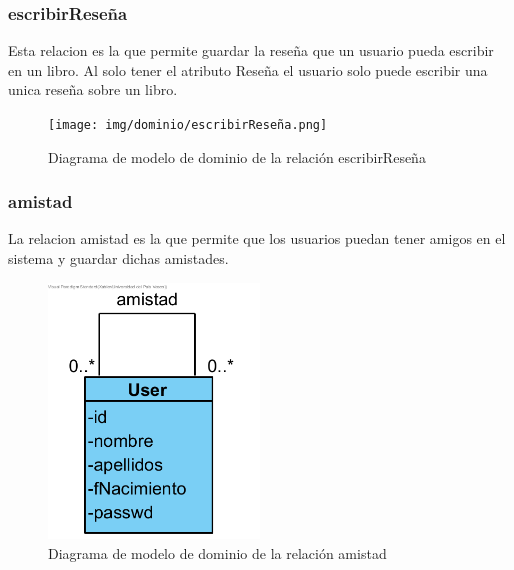 ﻿\documentclass{report}
\begin{document}
                \subsubsection{escribirReseña}
                    Esta relacion es la que permite guardar la reseña que un usuario pueda escribir en un libro. Al solo tener el atributo Reseña el usuario solo puede escribir una unica reseña sobre un libro.
                    \begin{figure}[H]
                        \centering
                        \texttt{[image: img/dominio/escribirReseña.png]}
                        \caption{Diagrama de modelo de dominio de la relación escribirReseña}
                    \end{figure}
                \clearpage
                \subsubsection{amistad}
                    La relacion amistad es la que permite que los usuarios puedan tener amigos en el sistema y guardar dichas amistades. 
                    \begin{figure}[H]
                        \centering
                        \includegraphics[width=0.5\textwidth]{img/dominio/amistad.png}
                        \caption{Diagrama de modelo de dominio de la relación amistad}
                    \end{figure}
                \clearpage
\end{document}
